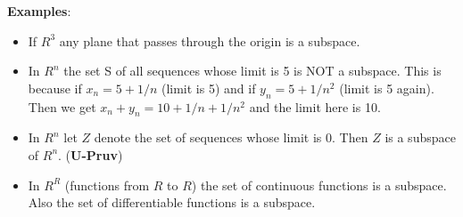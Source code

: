 \documentclass{article}
\begin{document}
\textbf{Examples}: 
\begin{itemize}
\item If $R^3$ any plane that passes through the origin is a subspace. 
\item In $R^n$ the set S of all sequences whose limit is 5 is NOT a subspace. This is because if $x_n = 5 + 1/n$ (limit is 5) and if $y_n = 5 + 1/n^2$ (limit is 5 again). Then we get $x_n + y_n = 10 + 1/n + 1/n^2$ and the limit here is 10. 
\item In $R^n$ let $Z$ denote the set of sequences whose limit is 0. Then $Z$ is a subspace of $R^n$. (\textbf{U-Pruv})
\item In $R^R$ (functions from $R$ to $R$) the set of continuous functions is a subspace. Also the set of differentiable functions is a subspace. 

\end{itemize}
\end{document}
